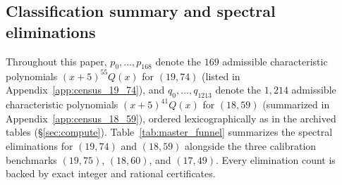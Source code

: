\documentclass[11pt,reqno]{amsart}
\theoremstyle{definition}
\theoremstyle{remark}
\numberwithin{equation}{section}
\numberwithin{table}{section}
\begin{document}
\subsection{Classification summary and spectral eliminations}
Throughout this paper, $p_0,\allowbreak \dots,\allowbreak p_{168}$ denote the $169$ admissible characteristic polynomials $(x+5)^{55}\allowbreak Q(x)$ for $(19, 74)$ (listed in Appendix~\ref{app:census_19_74}), and $q_0,\allowbreak \dots,\allowbreak q_{1213}$ denote the $1{,}214$ admissible characteristic polynomials $(x+5)^{41}\allowbreak Q(x)$ for $(18, 59)$ (summarized in Appendix~\ref{app:census_18_59}), ordered lexicographically as in the archived tables (\S\ref{sec:compute}). Table~\ref{tab:master_funnel} summarizes the spectral eliminations for $(19, 74)$ and $(18, 59)$ alongside the three calibration benchmarks $(19, 75)$, $(18, 60)$, and $(17, 49)$. Every elimination count is backed by exact integer and rational certificates.
\end{document}
